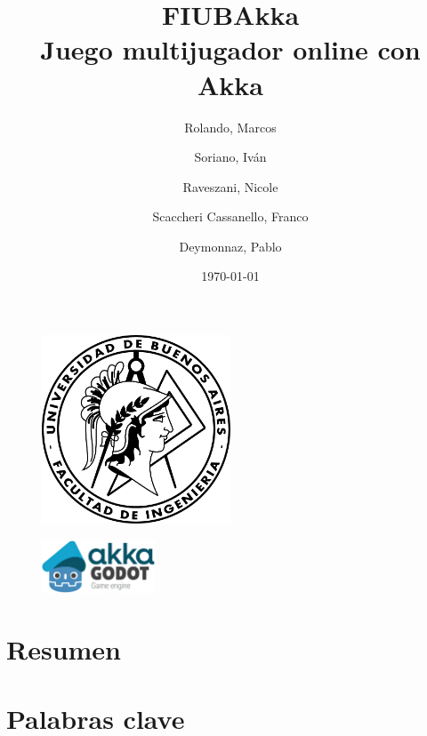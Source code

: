 \documentclass[11pt]{article}
\begin{document}
\title{\textbf{FIUBAkka} \\ \large \textbf{Juego multijugador online con Akka}}
\author{
    Rolando, Marcos
    \and
    Soriano, Iván
    \and
    Raveszani, Nicole
    \and
    Scaccheri Cassanello, Franco
    \and
    Deymonnaz, Pablo
}
\date{\today}

\maketitle %

\thispagestyle{empty}

\begin{figure}[htbp]
    \centering
    \includegraphics[width=0.5\textwidth]{../assets/fiuba-logo.png}
\end{figure}
\begin{figure}[htbp]
  \centering
  \includegraphics[width=0.3\textwidth]{../assets/fiubakka-logo.png}
\end{figure}

\newpage
\thispagestyle{empty}
\tableofcontents
\thispagestyle{empty}
\newpage

\setcounter{page}{1} %

\section{Resumen}



\section{Palabras clave}
\end{document}
